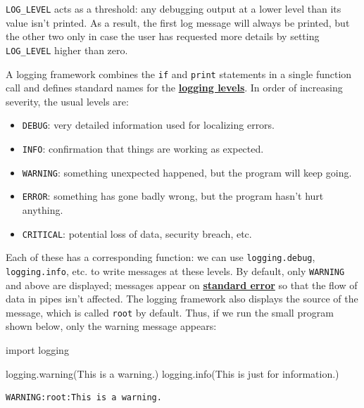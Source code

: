 \documentclass[
]{krantz}
\makeatletter
\newenvironment{Shaded}{\begin{snugshade}}{\end{snugshade}}
\newcommand{\ImportTok}[1]{#1}
\newcommand{\NormalTok}[1]{#1}
\newcommand{\StringTok}[1]{\textcolor[rgb]{0.31,0.60,0.02}{#1}}
\providecommand{\tightlist}{%
  \setlength{\itemsep}{0pt}\setlength{\parskip}{0pt}}
\newenvironment{kframe}{%
\medskip{}
\setlength{\fboxsep}{.8em}
 \def\at@end@of@kframe{}%
 \ifinner\ifhmode%
  \def\at@end@of@kframe{\end{minipage}}%
  \begin{minipage}{\columnwidth}%
 \fi\fi%
 \def\FrameCommand##1{\hskip\@totalleftmargin \hskip-\fboxsep
 \colorbox{shadecolor}{##1}\hskip-\fboxsep
     \hskip-\linewidth \hskip-\@totalleftmargin \hskip\columnwidth}%
 \MakeFramed {\advance\hsize-\width
   \@totalleftmargin\z@ \linewidth\hsize
   \@setminipage}}%
 {\par\unskip\endMakeFramed%
 \at@end@of@kframe}
\renewenvironment{Shaded}{\begin{kframe}}{\end{kframe}}
\newcommand{\gref}[2]{\hyperlink{#2}{\textbf{#1}}}
\makeatother
\begin{document}
\texttt{LOG\_LEVEL} acts as a threshold:
any debugging output at a lower level than its value isn't printed.
As a result,
the first log message will always be printed,
but the other two only in case the user has requested more details
by setting \texttt{LOG\_LEVEL} higher than zero.

A logging framework combines the \texttt{if} and \texttt{print} statements in a single function call
and defines standard names for the \gref{logging levels}{logging\_level}.
In order of increasing severity,
the usual levels are:

\begin{itemize}
\tightlist
\item
  \texttt{DEBUG}: very detailed information used for localizing errors.
\item
  \texttt{INFO}: confirmation that things are working as expected.
\item
  \texttt{WARNING}: something unexpected happened, but the program will keep going.
\item
  \texttt{ERROR}: something has gone badly wrong, but the program hasn't hurt anything.
\item
  \texttt{CRITICAL}: potential loss of data, security breach, etc.
\end{itemize}

Each of these has a corresponding function:
we can use \texttt{logging.debug}, \texttt{logging.info}, etc. to write messages at these levels.
By default,
only \texttt{WARNING} and above are displayed;
messages appear on \gref{standard error}{stderr}
so that the flow of data in pipes isn't affected.
The logging framework also displays the source of the message,
which is called \texttt{root} by default.
Thus,
if we run the small program shown below,
only the warning message appears:

\begin{Shaded}
\begin{Highlighting}[]
\ImportTok{import}\NormalTok{ logging}


\NormalTok{logging.warning(}\StringTok{\textquotesingle{}This is a warning.\textquotesingle{}}\NormalTok{)}
\NormalTok{logging.info(}\StringTok{\textquotesingle{}This is just for information.\textquotesingle{}}\NormalTok{)}
\end{Highlighting}
\end{Shaded}

\begin{verbatim}
WARNING:root:This is a warning.
\end{verbatim}
\end{document}
